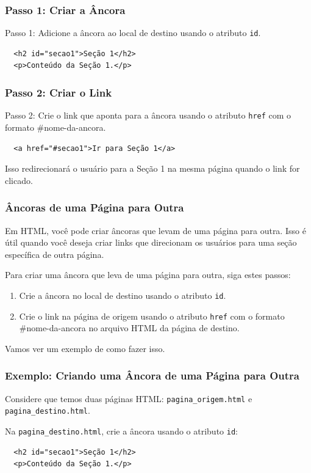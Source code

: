 \documentclass{beamer}
\begin{document}
\begin{frame}[fragile]
  \frametitle{Passo 1: Criar a Âncora}

  Passo 1: Adicione a âncora ao local de destino usando o atributo \texttt{id}.

  \begin{verbatim}
  <h2 id="secao1">Seção 1</h2>
  <p>Conteúdo da Seção 1.</p>
  \end{verbatim}
\end{frame}

\begin{frame}[fragile]
  \frametitle{Passo 2: Criar o Link}

  Passo 2: Crie o link que aponta para a âncora usando o atributo \texttt{href} com o formato \#nome-da-ancora.

  \begin{verbatim}
  <a href="#secao1">Ir para Seção 1</a>
  \end{verbatim}

  Isso redirecionará o usuário para a Seção 1 na mesma página quando o link for clicado.
\end{frame}


\begin{frame}
  \frametitle{Âncoras de uma Página para Outra}

  Em HTML, você pode criar âncoras que levam de uma página para outra. Isso é útil quando você deseja criar links que direcionam os usuários para uma seção específica de outra página.

  Para criar uma âncora que leva de uma página para outra, siga estes passos:

  \begin{enumerate}
    \item Crie a âncora no local de destino usando o atributo \texttt{id}.
    \item Crie o link na página de origem usando o atributo \texttt{href} com o formato \#nome-da-ancora no arquivo HTML da página de destino.
  \end{enumerate}

  Vamos ver um exemplo de como fazer isso.
\end{frame}

\begin{frame}[fragile]
  \frametitle{Exemplo: Criando uma Âncora de uma Página para Outra}

  Considere que temos duas páginas HTML: \texttt{pagina\_origem.html} e \texttt{pagina\_destino.html}.

  Na \texttt{pagina\_destino.html}, crie a âncora usando o atributo \texttt{id}:

  \begin{verbatim}
  <h2 id="secao1">Seção 1</h2>
  <p>Conteúdo da Seção 1.</p>
  \end{verbatim}
\end{frame}
\end{document}
